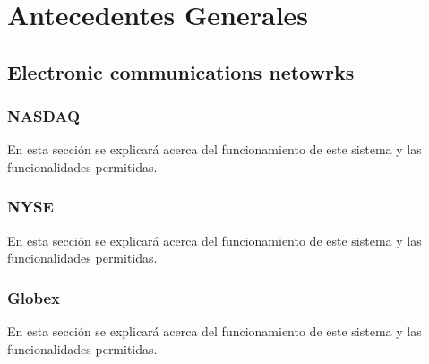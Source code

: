 \section{Antecedentes Generales}
\subsection{Electronic communications netowrks}
\subsubsection{NASDAQ}
En esta sección se explicará acerca del funcionamiento de este sistema y las funcionalidades permitidas.
\subsubsection{NYSE}
En esta sección se explicará acerca del funcionamiento de este sistema y las funcionalidades permitidas.
\subsubsection{Globex}
En esta sección se explicará acerca del funcionamiento de este sistema y las funcionalidades permitidas.
